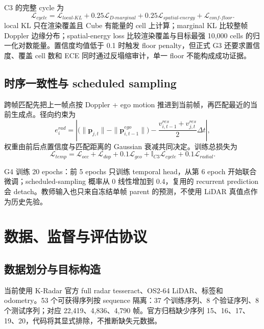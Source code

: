 \documentclass[11pt,a4paper,fontset=none]{ctexart}
\begin{document}
C3 的完整 cycle 为
\begin{equation}
  \mathcal L_{cycle}=\mathcal L_{local\text{-}KL}
  +0.25\mathcal L_{D\text{-}marginal}
  +0.25\mathcal L_{spatial\text{-}energy}
  +\mathcal L_{conf\text{-}floor}.
\end{equation}
local KL 只在渲染覆盖且 Cube 有能量的 cell 上计算；marginal KL 比较整帧 Doppler 边缘分布；spatial-energy loss 比较渲染覆盖与目标最强 10,000 cells 的归一化对数能量。置信度均值低于 0.1 时触发 floor penalty，但正式 G3 还要求置信度、覆盖 cell 数和 ECE 同时通过反塌缩审计，单一 floor 不能构成成功证据。

\subsection{时序一致性与 scheduled sampling}

跨帧匹配先把上一帧点按 Doppler + ego motion 推进到当前帧，再匹配最近的当前生成点。径向约束为
\begin{equation}
  e_i^{rad}=\left|
  \bigl(\|\mathbf p_{j,t}\|-\|\mathbf p^{ego}_{i,t-1}\|\bigr)
  -\frac{v^{res}_{i,t-1}+v^{res}_{j,t}}{2}\Delta t
  \right|,
\end{equation}
权重由前后点置信度与匹配距离的 Gaussian 衰减共同决定。训练总损失为
\begin{equation}
  \mathcal L_{temp}=\mathcal L_{occ}+\mathcal L_{dop}
  +0.1\mathcal L_{geo}+\mathbb I_{C3}\mathcal L_{cycle}
  +0.1\mathcal L_{radial}.
\end{equation}

G4 训练 20 epochs：前 5 epochs 只训练 temporal head，从第 6 epoch 开始联合微调；scheduled-sampling 概率从 0 线性增加到 0.4，复用的 recurrent prediction 会 detach。教师输入也只来自冻结单帧 parent 的预测，不使用 LiDAR 真值点作为历史先验。

\section{数据、监督与评估协议}

\subsection{数据划分与目标构造}

当前使用 K-Radar 官方 full radar tesseract、OS2-64 LiDAR、标签和 odometry。53 个可获得序列按 sequence 隔离：37 个训练序列、8 个验证序列、8 个测试序列；对应 22,419、4,836、4,790 帧。官方归档缺少序列 15、16、17、19、20，代码将其显式排除，不推断缺失元数据。
\end{document}
